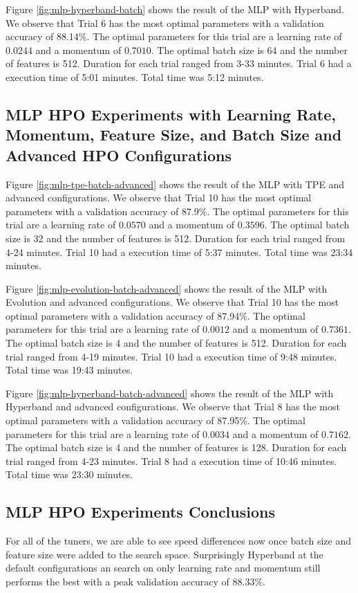 \documentclass{article}
\begin{document}
Figure \ref{fig:mlp-hyperband-batch} shows the result of the MLP with Hyperband. We observe that Trial 6 has the most optimal parameters with a validation accuracy of 88.14\%. The optimal parameters for this trial are a learning rate of $0.0244$ and a momentum of $0.7010$. The optimal batch size is 64 and the number of features is 512. Duration for each trial ranged from 3-33 minutes. Trial 6 had a execution time of 5:01 minutes. Total time was 5:12 minutes.

\subsection{MLP HPO Experiments with Learning Rate, Momentum, Feature Size, and Batch Size and Advanced HPO Configurations}
Figure \ref{fig:mlp-tpe-batch-advanced} shows the result of the MLP with TPE and advanced configurations. We observe that Trial 10 has the most optimal parameters with a validation accuracy of 87.9\%. The optimal parameters for this trial are a learning rate of $0.0570$ and a momentum of $0.3596$. The optimal batch size is 32 and the number of features is 512. Duration for each trial ranged from 4-24 minutes. Trial 10 had a execution time of 5:37 minutes. Total time was 23:34 minutes.

Figure \ref{fig:mlp-evolution-batch-advanced} shows the result of the MLP with Evolution and advanced configurations. We observe that Trial 10 has the most optimal parameters with a validation accuracy of 87.94\%. The optimal parameters for this trial are a learning rate of $0.0012$ and a momentum of $0.7361$. The optimal batch size is 4 and the number of features is 512. Duration for each trial ranged from 4-19 minutes. Trial 10 had a execution time of 9:48 minutes. Total time was 19:43 minutes.

Figure \ref{fig:mlp-hyperband-batch-advanced} shows the result of the MLP with Hyperband and advanced configurations. We observe that Trial 8 has the most optimal parameters with a validation accuracy of 87.95\%. The optimal parameters for this trial are a learning rate of $0.0034$ and a momentum of $0.7162$. The optimal batch size is 4 and the number of features is 128. Duration for each trial ranged from 4-23 minutes. Trial 8 had a execution time of 10:46 minutes. Total time was 23:30 minutes.

\subsection{MLP HPO Experiments Conclusions}
For all of the tuners, we are able to see speed differences now once batch size and feature size were added to the search space. Surprisingly Hyperband at the default configurations an search on only learning rate and momentum still performs the best with a peak validation accuracy of 88.33\%.
\end{document}

